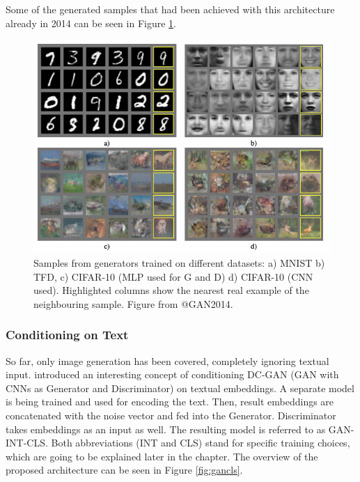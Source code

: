 \documentclass[
]{krantz}
\begin{document}
Some of the generated samples that had been achieved with this architecture already in 2014 can be seen in Figure \ref{fig:vanillagansamples}.

\begin{figure}

{\centering \includegraphics[width=0.8\linewidth]{figures/02-02-text-2-img/vanillagansamples} 

}

\caption{Samples from generators trained on different datasets: a) MNIST b) TFD, c) CIFAR-10 (MLP used for G and D) d) CIFAR-10 (CNN used). Highlighted columns show the nearest real example of the neighbouring sample. Figure from @GAN2014.}\label{fig:vanillagansamples}
\end{figure}

\hypertarget{conditioning-on-text}{%
\subsubsection{Conditioning on Text}\label{conditioning-on-text}}

So far, only image generation has been covered, completely ignoring textual input. \citet{GANTextToImage2016} introduced an interesting concept of conditioning DC-GAN (GAN with CNNs as Generator and Discriminator) on textual embeddings. A separate model is being trained and used for encoding the text. Then, result embeddings are concatenated with the noise vector and fed into the Generator. Discriminator takes embeddings as an input as well. The resulting model is referred to as GAN-INT-CLS. Both abbreviations (INT and CLS) stand for specific training choices, which are going to be explained later in the chapter. The overview of the proposed architecture can be seen in Figure \ref{fig:gancls}.
\end{document}

